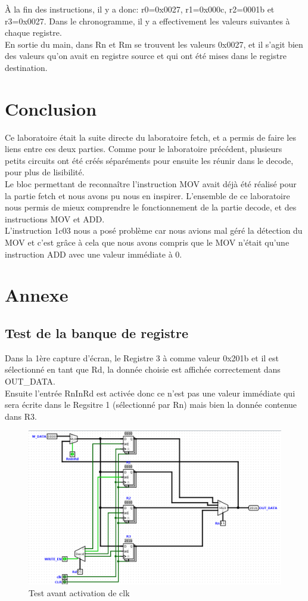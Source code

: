 \documentclass[a4paper]{article} %
\begin{document}
À la fin des instructions, il y a donc: r0=0x0027, r1=0x000c, r2=0001b et r3=0x0027.
Dans le chronogramme, il y a effectivement les valeurs suivantes à chaque registre. \\
En sortie du main, dans Rn et Rm se trouvent les valeurs 0x0027, et il s'agit bien des valeurs qu'on avait en registre source et qui ont été mises dans le registre destination.

\section{Conclusion}
Ce laboratoire était la suite directe du laboratoire fetch, et a permis de faire les liens entre ces deux parties. Comme pour le laboratoire précédent, plusieurs petits circuits ont été 
créés séparéments pour ensuite les réunir dans le decode, pour plus de lisibilité.\\
Le bloc permettant de reconnaître l'instruction MOV avait déjà été réalisé pour la partie fetch et nous avons pu nous en inspirer. L'ensemble de ce laboratoire nous permis de mieux comprendre le fonctionnement de la partie decode, et des instructions MOV et ADD.\\
L'instruction 1c03 nous a posé problème car nous avions mal géré la détection du MOV et c'est grâce à cela que nous avons compris que le MOV n'était qu'une instruction ADD avec une valeur immédiate à 0.

\section{Annexe}
\subsection{Test de la banque de registre}
Dans la 1ère capture d'écran, le Registre 3 à comme valeur 0x201b et il est sélectionné en tant que Rd, la donnée choisie est affichée correctement dans OUT\_DATA.\\
Ensuite l'entrée RnInRd est activée donc ce n'est pas une valeur immédiate qui sera écrite dans le Regsitre 1 (sélectionné par Rn) mais bien la donnée contenue dans R3.\\

\begin{figure}[H]
    \centering
    \includegraphics[width=1.3\textwidth]{src/TEST_REGISTERS_1.png}
    \caption{Test avant activation de clk}
    \label{test_1}
\end{figure}
    
\end{document}
